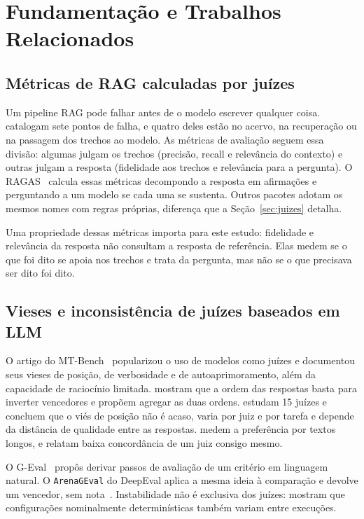 \documentclass[12pt]{article}
\newcommand{\code}[1]{\texttt{\small #1}}
\begin{document}
\section{Fundamentação e Trabalhos Relacionados}
\label{sec:fundamentacao}

\subsection{Métricas de RAG calculadas por juízes}

Um pipeline RAG pode falhar antes de o modelo escrever qualquer coisa.
\citet{barnett2024seven} catalogam sete pontos de falha, e quatro deles estão no
acervo, na recuperação ou na passagem dos trechos ao modelo. As métricas de
avaliação seguem essa divisão: algumas julgam os trechos (precisão, recall e
relevância do contexto) e outras julgam a resposta (fidelidade aos trechos e
relevância para a pergunta). O RAGAS~\cite{es2024ragas} calcula essas métricas
decompondo a resposta em afirmações e perguntando a um modelo se cada uma se
sustenta. Outros pacotes adotam os mesmos nomes com regras próprias, diferença
que a Seção~\ref{sec:juizes} detalha.

Uma propriedade dessas métricas importa para este estudo: fidelidade e
relevância da resposta não consultam a resposta de referência. Elas medem se o
que foi dito se apoia nos trechos e trata da pergunta, mas não se o que precisava
ser dito foi dito.

\subsection{Vieses e inconsistência de juízes baseados em LLM}

O artigo do MT-Bench~\cite{zheng2023judging} popularizou o uso de modelos como
juízes e documentou seus vieses de posição, de verbosidade e de
autoaprimoramento, além da capacidade de raciocínio limitada. \citet{wang2024fair}
mostram que a ordem das respostas basta para inverter vencedores e propõem
agregar as duas ordens. \citet{shi2025judging} estudam 15 juízes e concluem que o
viés de posição não é acaso, varia por juiz e por tarefa e depende da distância
de qualidade entre as respostas. \citet{saito2023verbosity} medem a preferência
por textos longos, e \citet{stureborg2024inconsistent} relatam baixa concordância
de um juiz consigo mesmo.

O G-Eval~\cite{liu2023geval} propôs derivar passos de avaliação de um critério em
linguagem natural. O \code{ArenaGEval} do DeepEval aplica a mesma ideia à
comparação e devolve um vencedor, sem nota~\cite{deepeval2026arena}. Instabilidade
não é exclusiva dos juízes: \citet{atil2025nondeterminism} mostram que
configurações nominalmente determinísticas também variam entre execuções.
\end{document}
